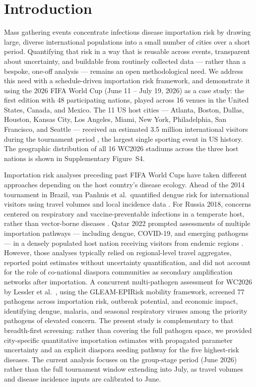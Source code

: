 \documentclass[12pt, a4paper]{article}
\begin{document}
\section{Introduction}

Mass gathering events concentrate infectious disease importation risk by drawing large, diverse international populations into a small number of cities over a short period. Quantifying that risk in a way that is reusable across events, transparent about uncertainty, and buildable from routinely collected data --- rather than a bespoke, one-off analysis --- remains an open methodological need. We address this need with a schedule-driven importation risk framework, and demonstrate it using the 2026 FIFA World Cup (June 11 -- July 19, 2026) as a case study: the first edition with 48 participating nations, played across 16 venues in the United States, Canada, and Mexico. The 11 US host cities --- Atlanta, Boston, Dallas, Houston, Kansas City, Los Angeles, Miami, New York, Philadelphia, San Francisco, and Seattle --- received an estimated 3.5 million international visitors during the tournament period \citep{NTTO2025}, the largest single sporting event in US history. The geographic distribution of all 16 WC2026 stadiums across the three host nations is shown in Supplementary Figure~S4.

Importation risk analyses preceding past FIFA World Cups have taken different approaches depending on the host country's disease ecology. Ahead of the 2014 tournament in Brazil, van Panhuis et al.\ quantified dengue risk for international visitors using travel volumes and local incidence data \citep{vanPanhuis2014}. For Russia 2018, concerns centered on respiratory and vaccine-preventable infections in a temperate host, rather than vector-borne diseases \citep{Pshenichnaya2018}. Qatar 2022 prompted assessments of multiple importation pathways --- including dengue, COVID-19, and emerging pathogens --- in a densely populated host nation receiving visitors from endemic regions \citep{AlTawfiq2022}. However, those analyses typically relied on regional-level travel aggregates, reported point estimates without uncertainty quantification, and did not account for the role of co-national diaspora communities as secondary amplification networks after importation. A concurrent multi-pathogen assessment for WC2026 by Lessler et al.~\cite{Lessler2026}, using the GLEAM-EPIRisk mobility framework, screened 77 pathogens across importation risk, outbreak potential, and economic impact, identifying dengue, malaria, and seasonal respiratory viruses among the priority pathogens of elevated concern. The present study is complementary to that breadth-first screening: rather than covering the full pathogen space, we provided city-specific quantitative importation estimates with propagated parameter uncertainty and an explicit diaspora seeding pathway for the five highest-risk diseases. The current analysis focuses on the group-stage period (June 2026) rather than the full tournament window extending into July, as travel volumes and disease incidence inputs are calibrated to June.
\end{document}
